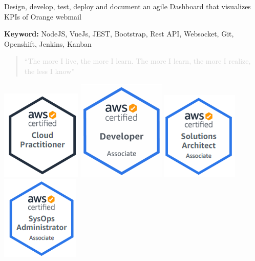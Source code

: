\documentclass[10pt,a4paper,normalphoto]{altacv}
\begin{document}
\begin{paracol}{2}
\divider

\item Design, develop, test, deploy and document an agile Dashboard that visualizes KPIs of Orange webmail
\item \textbf{Keyword:} NodeJS, VueJs, JEST, Bootstrap, Rest API, Websocket, Git, Openshift, Jenkins, Kanban
\medskip






\switchcolumn



\begin{quote}
\textcolor{LightGrey}{``The more I live, the more I learn. The more I learn, the more I realize, the less I know''}
\end{quote}



\includegraphics[width=0.1 \textwidth]{clf} \includegraphics[width=0.1 \textwidth]{dva} \includegraphics[width=0.1 \textwidth]{saa} \includegraphics[width=0.1 \textwidth]{soa}\\


\end{paracol}
\end{document}
